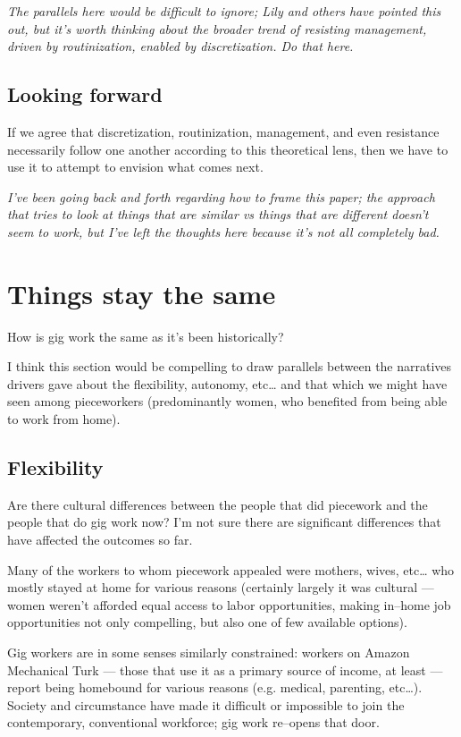 \documentclass{sigchi}
\begin{document}
\textit{The parallels here would be difficult to ignore;
Lily and others have pointed this out,
but it's worth thinking about the broader trend of
resisting management,
driven by routinization,
enabled by discretization.
Do that here.}



\subsection{Looking forward}
If we agree that
discretization,
routinization,
management,
and even resistance
necessarily follow one another according to this theoretical lens,
then we have to use it to attempt to envision
what comes next.



\textit{I've been going back and forth regarding how to frame this paper;
the approach that tries to look at
things that are similar vs things that are different
doesn't seem to work, but
I've left the thoughts here because it's not all completely bad.}

\section{Things stay the same}
How is gig work the same as it's been historically?

I think this section would be compelling to draw parallels between
the narratives drivers gave about the flexibility, autonomy, etc\dots
and that which we might have seen among pieceworkers
(predominantly women, who benefited from being able to work from home).

\subsection{Flexibility}
Are there cultural differences between the people that did piecework and
the people that do gig work now?
I'm not sure there are significant differences that have affected the outcomes so far.

Many of the workers to whom piecework appealed were mothers, wives, etc\dots
who mostly stayed at home for various reasons
(certainly largely it was cultural
--- women weren't afforded equal access to labor opportunities,
making in--home job opportunities not only compelling, but also one of few available options).

Gig workers are in some senses similarly constrained:
workers on Amazon Mechanical Turk
--- those that use it as a primary source of income, at least ---
report being homebound for various reasons (e.g. medical, parenting, etc\dots).
Society and circumstance have made it difficult
or impossible
to join the contemporary, conventional workforce;
gig work re--opens that door.
\end{document}
